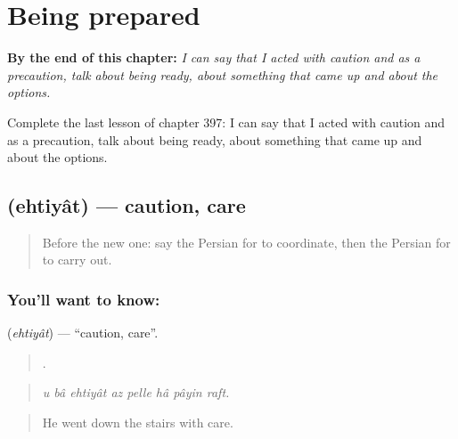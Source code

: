 
\chapter{Being prepared}
\label{ch:fa-being-prepared}

\begin{chapteropening}
\textbf{By the end of this chapter:} \emph{I can say that I acted with caution and as a precaution, talk about being ready, about something that came up and about the options.}

Complete the last lesson of chapter 397: I can say that I acted with caution and as a precaution, talk about being ready, about something that came up and about the options.
\end{chapteropening}

\section[\texorpdfstring{\fa{احتیاط} (ehtiyât)}{احتیاط (ehtiyât)}]{ (ehtiyât) — caution, care}

\label{lesson:FA-C397-ehtiyat}



\begin{quote}
Before the new one: say the Persian for to coordinate, then the Persian for to carry out.
\end{quote}

\subsection*{You'll want to know: }
\textbf{} (\emph{ehtiyât}) — \textquotedblleft{}caution, care\textquotedblright{}.

\begin{quote}
       .
\end{quote}

\begin{quote}
\emph{u bâ ehtiyât az pelle hâ pâyin raft.}
\end{quote}

\begin{quote}
He went down the stairs with care.
\end{quote}

